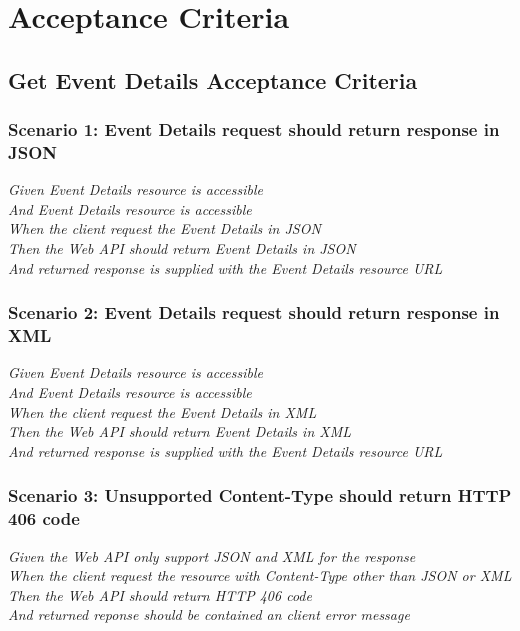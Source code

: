 \documentclass[a4paper, 12pt, oneside]{report}
\begin{document}
\appendix
\chapter{Acceptance Criteria} \label{lampiran-acceptance-criteria}
\section{Get Event Details Acceptance Criteria}
\subsection{Scenario 1: Event Details request should return response in JSON}

\onehalfspacing \textit{Given Event Details resource is accessible\\
And Event Details resource is accessible\\
When the client request the Event Details in JSON\\
Then the Web API should return Event Details in JSON\\
And returned response is supplied with the Event Details resource URL\\}

\subsection{Scenario 2: Event Details request should return response in XML}

\onehalfspacing \textit{Given Event Details resource is accessible\\
And Event Details resource is accessible\\
When the client request the Event Details in XML\\
Then the Web API should return Event Details in XML\\
And returned response is supplied with the Event Details resource URL\\}

\subsection{Scenario 3: Unsupported Content-Type should return HTTP 406 code}

\onehalfspacing \textit{Given the Web API only support JSON and XML for the response\\
When the client request the resource with Content-Type other than JSON or XML\\
Then the Web API should return HTTP 406 code\\
And returned reponse should be contained an client error message}
\end{document}
